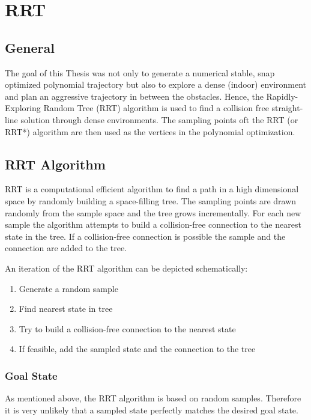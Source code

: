 \chapter{RRT}\label{chap:RRT}

\section{General}

The goal of this Thesis was not only to generate a numerical stable, snap optimized polynomial trajectory but also to explore a dense (indoor) environment and plan an aggressive trajectory in between the obstacles. Hence, the Rapidly-Exploring Random Tree (RRT) algorithm is used to find a collision free straight-line solution through dense environments. The sampling points oft the RRT (or RRT*) algorithm are then used as the vertices in the polynomial optimization.


\section{RRT Algorithm}\label{sec:RRT}

RRT is a computational efficient algorithm to find a path in a high dimensional space by randomly building a space-filling tree. The sampling points are drawn randomly from the sample space and the tree grows incrementally. 
For each new sample the algorithm attempts to build a collision-free connection to the nearest state in the tree. If a collision-free connection is possible the sample and the connection are added to the tree. \newline

An iteration of the RRT algorithm can be depicted schematically:


\begin{enumerate}
  \item Generate a random sample
  \item Find nearest state in tree
  \item Try to build a collision-free connection to the nearest state
  \item If feasible, add the sampled state and the connection to the tree
\end{enumerate}

\subsection{Goal State}

As mentioned above, the RRT algorithm is based on random samples. Therefore it is very unlikely that a sampled state perfectly matches the desired goal state. \newline

